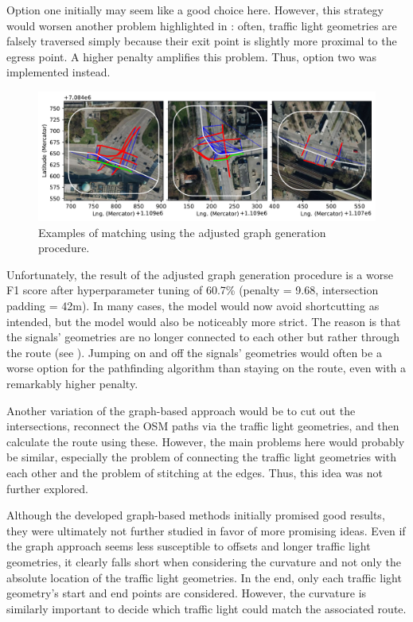 Option one initially may seem like a good choice here. However, this strategy would worsen another problem highlighted in : often, traffic light geometries are falsely traversed simply because their exit point is slightly more proximal to the egress point. A higher penalty amplifies this problem. Thus, option two was implemented instead. 

\begin{figure}[htbp]
\centering
\includegraphics[width=\linewidth]{images/matching-dijkstra-strict.pdf}
\caption{Examples of matching using the adjusted graph generation procedure.}
\label{fig:sg-selection-graph-strict}
\end{figure}

Unfortunately, the result of the adjusted graph generation procedure is a worse F1 score after hyperparameter tuning of 60.7\% (penalty = 9.68, intersection padding = 42m). In many cases, the model would now avoid shortcutting as intended, but the model would also be noticeably more strict. The reason is that the signals' geometries are no longer connected to each other but rather through the route (see ). Jumping on and off the signals' geometries would often be a worse option for the pathfinding algorithm than staying on the route, even with a remarkably higher penalty. 

Another variation of the graph-based approach would be to cut out the intersections, reconnect the OSM paths via the traffic light geometries, and then calculate the route using these. However, the main problems here would probably be similar, especially the problem of connecting the traffic light geometries with each other and the problem of stitching at the edges. Thus, this idea was not further explored.

Although the developed graph-based methods initially promised good results, they were ultimately not further studied in favor of more promising ideas. Even if the graph approach seems less susceptible to offsets and longer traffic light geometries, it clearly falls short when considering the curvature and not only the absolute location of the traffic light geometries. In the end, only each traffic light geometry's start and end points are considered. However, the curvature is similarly important to decide which traffic light could match the associated route.

